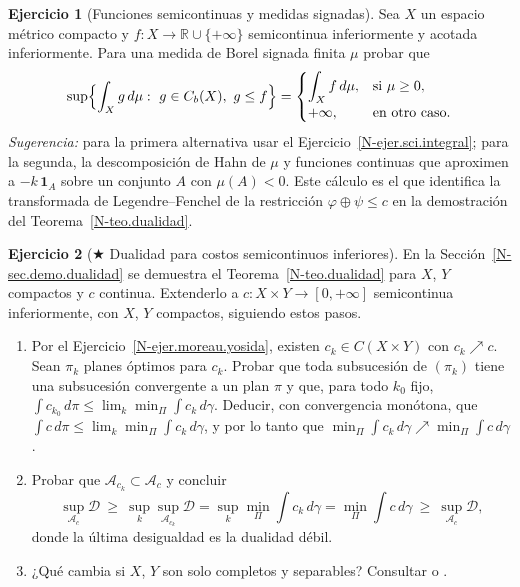 \documentclass[11pt,a4paper]{amsart}
\newcounter{chapter}
\newcommand{\R}{{\mathbb R}}
\newcommand{\D}{{\mathcal D}}
\newcommand{\I}{{\mathbf 1}}
\theoremstyle{remark}
\theoremstyle{definition}
\newtheorem{ejercicio}{Ejercicio}[chapter]
\numberwithin{subsection}{section}
\numberwithin{equation}{section}
\begin{document}
\begin{ejercicio}[Funciones semicontinuas y medidas signadas]\label{ejer.sci.signadas}
Sea $X$ un espacio métrico compacto y $f\colon X\to\R\cup\{+\infty\}$
semicontinua inferiormente y acotada inferiormente. Para una medida de
Borel signada finita $\mu$ probar que
\[
\sup\Bigl\{\int_Xg\,d\mu:\ g\in C_b(X),\ g\le f\Bigr\}
=\begin{cases}\displaystyle\int_Xf\,d\mu,&\text{si }\mu\ge0,\\[1ex]
+\infty,&\text{en otro caso.}\end{cases}
\]
\emph{Sugerencia:} para la primera alternativa usar el
Ejercicio~\ref{N-ejer.sci.integral}; para la segunda, la descomposición de
Hahn de $\mu$ y funciones continuas que aproximen a
$-k\,\I_{A}$ sobre un conjunto $A$ con $\mu(A)<0$. Este cálculo es el que
identifica la transformada de Legendre--Fenchel de la restricción
$\varphi\oplus\psi\le c$ en la demostración del Teorema~\ref{N-teo.dualidad}.
\end{ejercicio}

\begin{ejercicio}[$\bigstar$ Dualidad para costos semicontinuos inferiores]\label{ejer.dualidad.sci}
En la Sección~\ref{N-sec.demo.dualidad} se demuestra el Teorema~\ref{N-teo.dualidad}
para $X$, $Y$ compactos y $c$ continua. Extenderlo a $c\colon X\times Y\to[0,+\infty]$
semicontinua inferiormente, con $X$, $Y$ compactos, siguiendo estos pasos.
\begin{enumerate}[label=(\alph*)]
\item Por el Ejercicio~\ref{N-ejer.moreau.yosida}, existen $c_k\in C(X\times Y)$
con $c_k\nearrow c$. Sean $\pi_k$ planes óptimos para $c_k$. Probar que toda
subsucesión de $(\pi_k)$ tiene una subsucesión convergente a un plan $\pi$ y
que, para todo $k_0$ fijo,
$\int c_{k_0}\,d\pi\le\lim_k\min_{\Pi}\int c_k\,d\gamma$. Deducir, con
convergencia monótona, que $\int c\,d\pi\le\lim_k\min_\Pi\int c_k\,d\gamma$,
y por lo tanto que $\min_\Pi\int c_k\,d\gamma\nearrow\min_\Pi\int c\,d\gamma$.
\item Probar que $\mathcal A_{c_k}\subset\mathcal A_c$ y concluir
\[
\sup_{\mathcal A_c}\D\ \ge\ \sup_k\sup_{\mathcal A_{c_k}}\D
=\sup_k\min_\Pi\int c_k\,d\gamma=\min_\Pi\int c\,d\gamma\ \ge\ \sup_{\mathcal A_c}\D,
\]
donde la última desigualdad es la dualidad débil.
\item ¿Qué cambia si $X$, $Y$ son solo completos y separables? Consultar
\cite[Thm.~1.3]{Villani2003} o \cite[Thm.~1.39]{Santambrogio}.
\end{enumerate}
\end{ejercicio}
\end{document}
